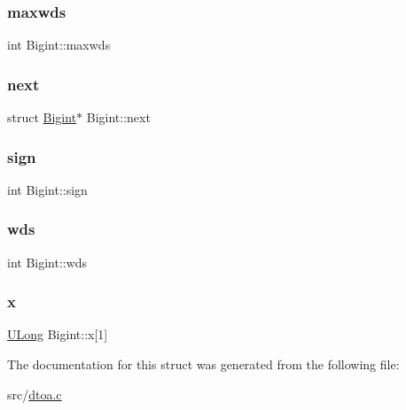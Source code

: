 \mbox{\label{struct_bigint_a5ffcac6f95ded3bc1fc23204f46f10d0}} 
\subsubsection{\texorpdfstring{maxwds}{maxwds}}
{\footnotesize\ttfamily int Bigint\+::maxwds}

\mbox{\label{struct_bigint_a3a1296e26ef617e775d5e366e390e7fc}} 
\subsubsection{\texorpdfstring{next}{next}}
{\footnotesize\ttfamily struct \hyperlink{struct_bigint}{Bigint}$\ast$ Bigint\+::next}

\mbox{\label{struct_bigint_a4380eb98f7653bb74d8377c0d68d6cb7}} 
\subsubsection{\texorpdfstring{sign}{sign}}
{\footnotesize\ttfamily int Bigint\+::sign}

\mbox{\label{struct_bigint_aa737992ebddb9d6a7e2d23bfecdb080e}} 
\subsubsection{\texorpdfstring{wds}{wds}}
{\footnotesize\ttfamily int Bigint\+::wds}

\mbox{\label{struct_bigint_ae56981315f471a190603887aee98ca99}} 
\subsubsection{\texorpdfstring{x}{x}}
{\footnotesize\ttfamily \hyperlink{dtoa_8c_afa5f820499f9d3fb566021c346784449}{U\+Long} Bigint\+::x\mbox{[}1\mbox{]}}



The documentation for this struct was generated from the following file\+:\begin{DoxyCompactItemize}
\item 
src/\hyperlink{dtoa_8c}{dtoa.\+c}\end{DoxyCompactItemize}
